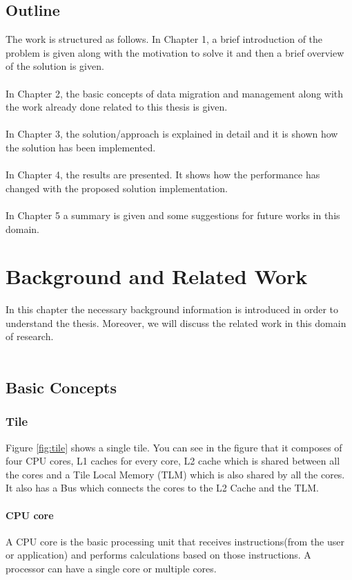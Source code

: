 \documentclass{listhesis}
\begin{document}
\section{Outline}
The work is structured as follows. In Chapter 1, a brief introduction of the problem is given along with the motivation to solve it and then a brief overview of the solution is given.\\
\\
In Chapter 2, the basic concepts of data migration and management along with the work already done related to this thesis is given.\\
\\
In Chapter 3, the solution/approach is explained in detail and it is shown how the solution has been implemented. \\
\\
In Chapter 4, the results are presented. It shows how the performance has changed with the proposed solution implementation. \\
\\
In Chapter 5 a summary is given and some suggestions for future works in this domain. 
\chapter{Background and Related Work}
In this chapter the necessary background information is introduced in order to understand the thesis. Moreover, we will discuss the related work in this domain of research.\\
\\
\section{Basic Concepts}
\subsection{Tile}
Figure \ref{fig:tile} shows a single tile. You can see in the figure that it composes of four CPU cores, L1 caches for every core, L2 cache which is shared between all the cores and a Tile Local Memory (TLM) which is also shared by all the cores. It also has a Bus which connects the cores to the L2 Cache and the TLM.
\subsubsection{CPU core}
A CPU core is the basic processing unit that receives instructions(from the user or application) and performs calculations based on those instructions. A processor can have a single core or multiple cores.  
\end{document}
